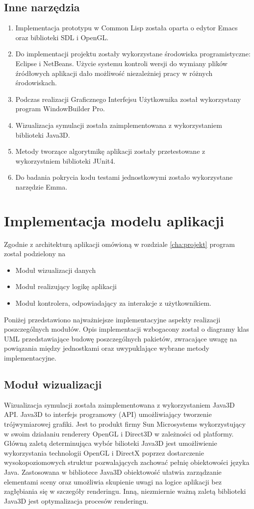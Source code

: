 \subsection{Inne narzędzia}
\begin{enumerate}
\item Implementacja prototypu w Common Lisp została oparta o edytor Emacs oraz biblioteki SDL i OpenGL.
\item Do implementacji projektu zostały wykorzystane środowiska programistyczne: Eclipse i NetBeans. Użycie systemu kontroli wersji do wymiany plików źródłowych aplikacji dało możliwość niezależniej pracy w różnych środowiskach.
\item Podczas realizacji Graficznego Interfejsu Użytkownika został wykorzystany program WindowBuilder Pro.
\item Wizualizacja symulacji została zaimplementowana z wykorzystaniem biblioteki Java3D.
\item Metody tworzące algorytmikę aplikacji zostały przetestowane z wykorzystniem biblioteki JUnit4.
\item Do badania pokrycia kodu testami jednostkowymi zostało wykorzystane narzędzie Emma.
\end{enumerate}


\section {Implementacja modelu aplikacji}
Zgodnie z architekturą aplikacji omówioną w rozdziale \ref{cha:projekt} program został podzielony na 
\begin{itemize}
\item Moduł wizualizacji danych
\item Moduł realizujący logikę aplikacji
\item Moduł kontrolera, odpowiadający za interakcje z użytkownikiem.
\end{itemize}
Poniżej przedstawiono najważniejsze implementacyjne aspekty realizacji poszczególnych modułów.
Opis implementacji wzbogacony został o diagramy klas UML przedstawiające budowę poszczególnych pakietów, zwracające uwagę na powiązania między jednostkami oraz uwypuklające wybrane metody implementacyjne.
\subsection {Moduł wizualizacji}
Wizualizacja symulacji została zaimplementowana z wykorzystaniem Java3D API.
Java3D to interfejs programowy (API) umożliwiający tworzenie trójwymiarowej grafiki. Jest to produkt firmy Sun Microsystems wykorzystujący w swoim działaniu renderery OpenGL i Direct3D w zależności od platformy.
Główną zaletą determinująca wybór bilioteki Java3D jest umożliwienie wykorzystania technologii OpenGL i DirectX poprzez dostarczenie wysokopoziomowych struktur pozwalających zachować pełnię obiektowości języka Java. 
Zastosowana w bibliotece Java3D obiektowość ułatwia zarządzanie elementami sceny oraz umożliwia skupienie uwagi na logice aplikacji bez zagłębiania się w szczegóły renderingu. Inną, niezmiernie ważną zaletą biblioteki Java3D jest optymalizacja procesów renderingu.

